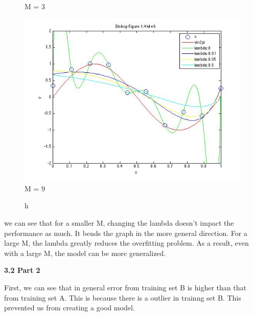\begin{figure}[!htb]
  \caption{M = 3}\label{fig:figures/p3_bishop_m=3}
\endminipage\hfill
{}%
  \includegraphics[width=\linewidth]{figures/p3_bishop_m=9}
  \caption{M = 9}\label{fig:figures/p3_bishop_m=9}
\endminipage\hfill

\end{figure}



\begin{figure}{h}
\end{figure}





we can see that for a smaller M, changing the lambda doesn't impact the performance as much. It bends the graph in the more general direction. For a large M, the lambda greatly reduces the overfitting problem. As a result, even with a large M, the model can be more generalized. 

{\bfseries 3.2 Part 2}

First, we can see that in general error from training set B is higher than that from training set A. 
This is because there is a outlier in trainng set B. This prevented us from creating a good model. 


